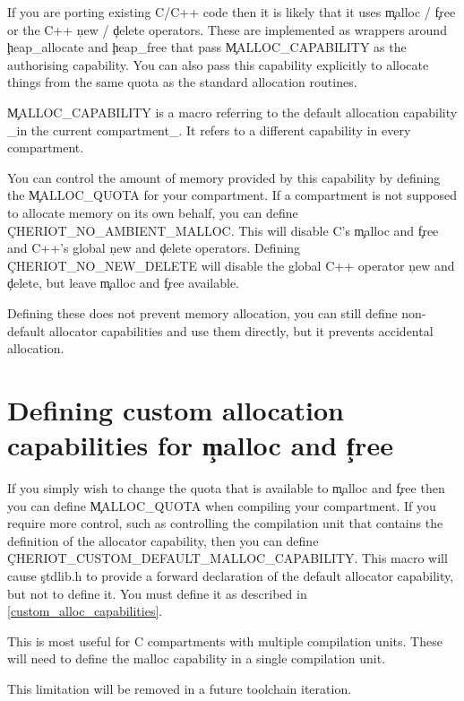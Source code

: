 If you are porting existing C/C++ code then it is likely that it uses \c{malloc} / \c{free} or the C++ \c{new} / \c{delete} operators.
These are implemented as wrappers around \c{heap_allocate} and \c{heap_free} that pass \c{MALLOC_CAPABILITY} as the authorising capability.
You can also pass this capability explicitly to allocate things from the same quota as the standard allocation routines.

\begin{note}
	\c{MALLOC_CAPABILITY} is a macro referring to the default allocation capability _in the current compartment_.
	It refers to a different capability in every compartment.
\end{note}

You can control the amount of memory provided by this capability by defining the \c{MALLOC_QUOTA} for your compartment.
If a compartment is not supposed to allocate memory on its own behalf, you can define \c{CHERIOT_NO_AMBIENT_MALLOC}.
This will disable C's \c{malloc} and \c{free} and C++'s global \c{new} and \c{delete} operators.
Defining \c{CHERIOT_NO_NEW_DELETE} will disable the global C++ operator \c{new} and \c{delete}, but leave \c{malloc} and \c{free} available.

Defining these does not prevent memory allocation, you can still define non-default allocator capabilities and use them directly, but it prevents accidental allocation.

\section{Defining custom allocation capabilities for \c{malloc} and \c{free}}

If you simply wish to change the quota that is available to \c{malloc} and \c{free} then you can define \c{MALLOC_QUOTA} when compiling your compartment.
If you require more control, such as controlling the compilation unit that contains the definition of the allocator capability, then you can define \c{CHERIOT_CUSTOM_DEFAULT_MALLOC_CAPABILITY}.
This macro will cause \c{stdlib.h} to provide a forward declaration of the default allocator capability, but not to define it.
You must define it as described in \ref{custom_alloc_capabilities}.

This is most useful for C compartments with multiple compilation units.
These will need to define the malloc capability in a single compilation unit.

\begin{note}
This limitation will be removed in a future toolchain iteration.
\end{note}

